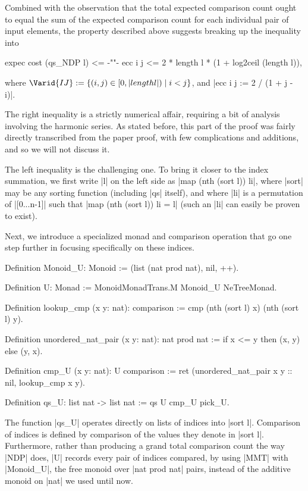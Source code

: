 \documentclass[runningheads]{llncs}
\begin{document}
Combined with the observation that the total expected comparison count ought to equal the sum of the expected comparison count for each individual pair of input elements, the property described above suggests breaking up the inequality into
\begin{code}
  expec cost (qs_NDP l) <= {-""-} ecc i j <= 2 * length l * (1 + log2ceil (length l)),
\end{code}
where $\Varid{IJ} := \{ (i, j) \in [0, |length l|) \mid i < j \}$, and |ecc i j := 2 / (1 + j - i)|.

The right inequality is a strictly numerical affair, requiring a bit of analysis involving the harmonic series. As stated before, this part of the proof 
    was 
fairly directly transcribed from the paper proof, with few complications and additions, and so we will not discuss it.

The left inequality is the challenging one. To bring it closer to the index summation, we first write |l| on the left side as |map (nth (sort l)) li|, where |sort| may be any sorting function (including |qs| itself), and where |li| is a permutation of |[0...n-1]| such that |map (nth (sort l)) li = l| (such an |li| can easily be proven to exist).

Next, we introduce a specialized monad and comparison operation that go one step further in focusing specifically on these indices.
\begin{code}
  Definition Monoid_U: Monoid := (list (nat prod nat), nil, ++).

  Definition U: Monad := MonoidMonadTrans.M Monoid_U NeTreeMonad.

  Definition lookup_cmp (x y: nat): comparison :=
    cmp (nth (sort l) x) (nth (sort l) y).

  Definition unordered_nat_pair (x y: nat): nat prod nat :=
    if x <= y then (x, y) else (y, x).

  Definition cmp_U (x y: nat): U comparison :=
    ret (unordered_nat_pair x y :: nil, lookup_cmp x y).

  Definition qs_U: list nat -> list nat := qs U cmp_U pick_U.
\end{code}
The function |qs_U| operates directly on lists of indices into |sort l|. Comparison of indices is defined by comparison of the %
values they denote in |sort l|. Furthermore, rather than producing a grand total comparison count the way |NDP| does, |U| records every pair of indices compared, by using |MMT| with |Monoid_U|, the free monoid over |nat prod nat| pairs, instead of the additive monoid on |nat| we used until now.
\end{document}
